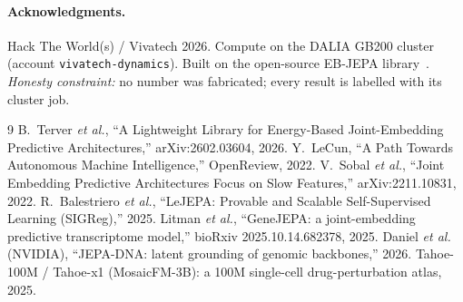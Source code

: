 \documentclass[10pt,twocolumn]{article}
\begin{document}
\paragraph{Acknowledgments.}
Hack The World(s) / Vivatech 2026. Compute on the DALIA GB200 cluster (account
\texttt{vivatech-dynamics}). Built on the open-source EB-JEPA library~\cite{ebjepa}. \emph{Honesty
constraint:} no number was fabricated; every result is labelled with its cluster job.

\begin{thebibliography}{9}
\small
{} B.~Terver \emph{et al.},
``A Lightweight Library for Energy-Based Joint-Embedding Predictive Architectures,'' arXiv:2602.03604, 2026.
 Y.~LeCun, ``A Path Towards Autonomous Machine Intelligence,'' OpenReview, 2022.
 V.~Sobal \emph{et al.}, ``Joint Embedding Predictive Architectures Focus on Slow
Features,'' arXiv:2211.10831, 2022.
 R.~Balestriero \emph{et al.}, ``LeJEPA: Provable and Scalable Self-Supervised Learning
(SIGReg),'' 2025.
 Litman \emph{et al.}, ``GeneJEPA: a joint-embedding predictive transcriptome model,''
bioRxiv 2025.10.14.682378, 2025.
 Daniel \emph{et al.} (NVIDIA), ``JEPA-DNA: latent grounding of genomic backbones,''
2026.
 Tahoe-100M / Tahoe-x1 (MosaicFM-3B): a 100M single-cell drug-perturbation atlas, 2025.
\end{thebibliography}
\end{document}
